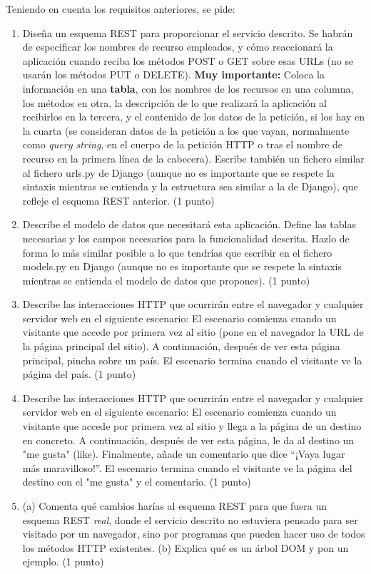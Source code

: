 \newpage

Teniendo en cuenta los requisitos anteriores, se pide:

\begin{enumerate}
  \item Diseña un esquema REST para proporcionar el servicio descrito. Se habrán de especificar los nombres de recurso empleados, y cómo reaccionará la aplicación cuando reciba los métodos POST o GET sobre esas URLs (no se usarán los métodos PUT o DELETE). \textbf{Muy importante:} Coloca la información en una \textbf{tabla}, con los nombres de los recursos en una columna, los métodos en otra, la descripción de lo que realizará la aplicación al recibirlos en la tercera, y el contenido de los datos de la petición, si los hay en la cuarta (se consideran datos de la petición a los que vayan, normalmente como \emph{query string}, en el cuerpo de la petición HTTP o tras el nombre de recurso en la primera línea de la cabecera). Escribe también un fichero similar al fichero urls.py de Django (aunque no es importante que se respete la sintaxis mientras se entienda y la estructura sea similar a la de Django), que refleje el esquema REST anterior. (1 punto)

  \item Describe el modelo de datos que necesitará esta aplicación. Define las tablas necesarias y los campos necesarios para la funcionalidad descrita. Hazlo de forma lo más similar posible a lo que tendrías que escribir en el fichero models.py en Django (aunque no es importante que se respete la sintaxis mientras se entienda el modelo de datos que propones). (1 punto)

  \item Describe las interacciones HTTP que ocurrirán entre el navegador y cualquier servidor web en el siguiente escenario: El escenario comienza cuando un visitante que accede por primera vez al sitio (pone en el navegador la URL de la página principal del sitio). A continuación, después de ver esta página principal, pincha sobre un país. El escenario termina cuando el visitante ve la página del país. (1 punto)

  \item Describe las interacciones HTTP que ocurrirán entre el navegador y cualquier servidor web en el siguiente escenario: El escenario comienza cuando un visitante que accede por primera vez al sitio y llega a la página de un destino en concreto. A continuación, después de ver esta página, le da al destino un "me gusta" (like). Finalmente, añade un comentario que dice ``¡Vaya lugar más maravilloso!''. El escenario termina cuando el visitante ve la página del destino con el "me gusta" y el comentario. (1 punto)

  \item (a) Comenta qué cambios harías al esquema REST para que fuera un esquema REST \emph{real}, donde el servicio descrito no estuviera pensado para ser visitado por un navegador, sino por programas que pueden hacer uso de todos los métodos HTTP existentes. (b) Explica qué es un árbol DOM y pon un ejemplo. (1 punto)
\end{enumerate}

